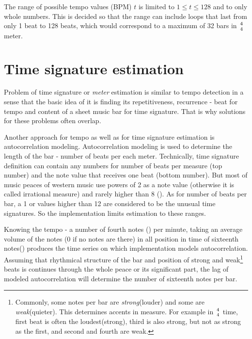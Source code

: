 The range of possible tempo values (\ac{BPM}) $t$ is limited to $1 \le t \le 128$ and to only whole numbers. This is
decided so that the range can include loops that last from only 1 beat to 128 beats, which would correspond to a maximum
of 32 bars in $4\atop4$ meter.

\section{Time signature estimation}\label{sec:time-signature-estimation}
Problem of time signature or \textit{meter} estimation is similar to tempo detection in a sense that the basic idea of
it is finding its repetitiveness, recurrence - beat for tempo and content of a sheet music bar for time signature. That
is why solutions for these problems often overlap.

Another approach for tempo as well as for time signature estimation is autocorrelation modeling. Autocorrelation
modeling is used to determine the length of the bar - number of beats per each meter. Technically, time signature
definition can contain any numbers for number of beats per measure (top number) and the note value that receives one
beat (bottom number). But most of music peaces of western music use powers of 2 as a note value (otherwise it is called
irrational measure) and rarely higher than 8 (\Acht). As for number of beats per bar, a 1 or values higher than 12 are
considered to be the unusual time signatures. So the implementation limits estimation to these ranges.

Knowing the tempo - a number of fourth notes (\Vier) per minute, taking an average volume of the notes (0 if no notes
are there) in all position in time of sixteenth notes(\Sech) produces the time series on which implementation models
autocorrelation. Assuming that rhythmical structure of the bar and position of strong and weak\footnote{Commonly, some
notes per bar are \textit{strong}(louder) and some are \textit{weak}(quieter). This determines accents in measure. For
example in $4\atop4$ time, first beat is often the loudest(strong), third is also strong, but not as strong as
the first, and second and fourth are weak.} beats is continues through the whole peace or its significant part, the lag
of modeled autocorrelation will determine the number of sixteenth notes per bar.

